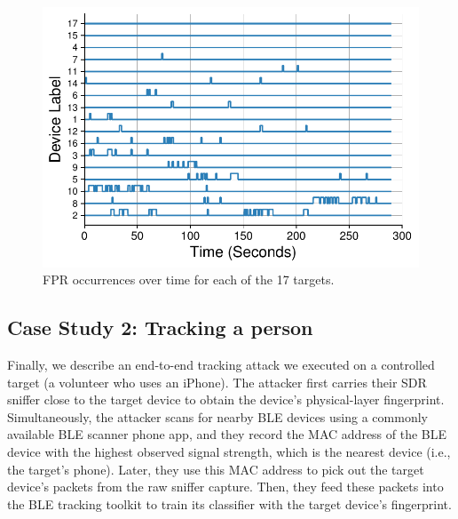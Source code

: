\begin{figure}[t!]
    \centering
    \includegraphics[width = \linewidth]{bletracking/plots/fpr_time_10sec_sort2.pdf} 
    \caption{FPR occurrences over time for each of the 17 targets.}
    \label{fig:fpr_time}
\end{figure}










\subsection{Case Study 2: Tracking a person}
\label{sec:results:case2}

%
%



Finally, we describe an end-to-end tracking attack we executed on a controlled
target (a volunteer who uses an iPhone).
%
The attacker first carries their SDR sniffer close to the target device to
obtain the device's physical-layer fingerprint. Simultaneously, the attacker
scans for nearby BLE devices using a commonly available BLE scanner phone app,
and they record the MAC address of the BLE device with the highest observed
signal strength, which is the nearest device (i.e., the target's phone). Later,
they use this MAC address to pick out the target device's packets from the raw
sniffer capture. Then, they feed these packets into the BLE tracking toolkit to
train its classifier with the target device's fingerprint.

